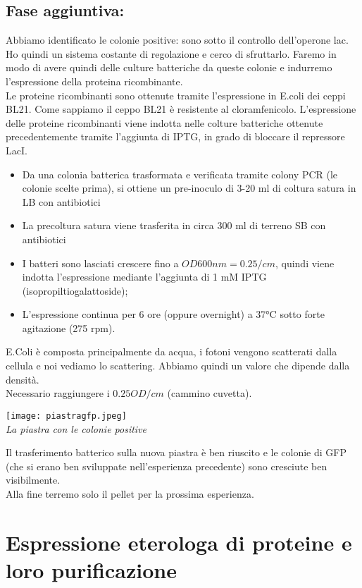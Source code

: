 \documentclass{extarticle}
\begin{document}
\subsection*{Fase aggiuntiva:}
Abbiamo identificato le colonie positive: sono sotto il controllo dell'operone lac. Ho quindi un sistema costante di regolazione e cerco di sfruttarlo.
Faremo in modo di avere quindi delle culture batteriche da queste colonie e indurremo l'espressione della proteina ricombinante.\\
Le proteine ricombinanti sono ottenute tramite l'espressione in E.coli dei ceppi BL21. Come sappiamo il ceppo BL21 è resistente al cloramfenicolo. 
L'espressione delle proteine ricombinanti viene indotta nelle colture batteriche ottenute precedentemente tramite l'aggiunta di IPTG, in grado di bloccare il repressore LacI.\\
\begin{itemize}
    \item Da una colonia batterica trasformata  e verificata tramite colony PCR (le colonie scelte prima), si ottiene un pre-inoculo di 3-20 ml di coltura satura in LB con antibiotici
    \item La precoltura satura viene trasferita in circa 300 ml di terreno SB con antibiotici 
    \item I batteri sono lasciati crescere fino a $OD600nm=0.25/cm$, quindi viene indotta l'espressione mediante l'aggiunta di 1 mM IPTG (isopropiltiogalattoside);
    \item L'espressione continua per 6 ore (oppure overnight) a 37°C sotto forte agitazione (275 rpm). 
\end{itemize}
E.Coli è composta principalmente da acqua, i fotoni vengono scatterati dalla cellula e noi vediamo lo scattering. Abbiamo quindi un valore che dipende dalla densità.\\
Necessario raggiungere i $0.25OD/cm$ (cammino cuvetta).
\begin{center}
    \texttt{[image: piastragfp.jpeg]}\\
    \emph{La piastra con le colonie positive}
\end{center}
Il trasferimento batterico sulla nuova piastra è ben riuscito e le colonie di GFP (che si erano ben sviluppate nell'esperienza precedente) sono cresciute ben visibilmente.\\
Alla fine terremo solo il pellet per la prossima esperienza.

\newpage
\section{Espressione eterologa di proteine e loro purificazione}
\end{document}
